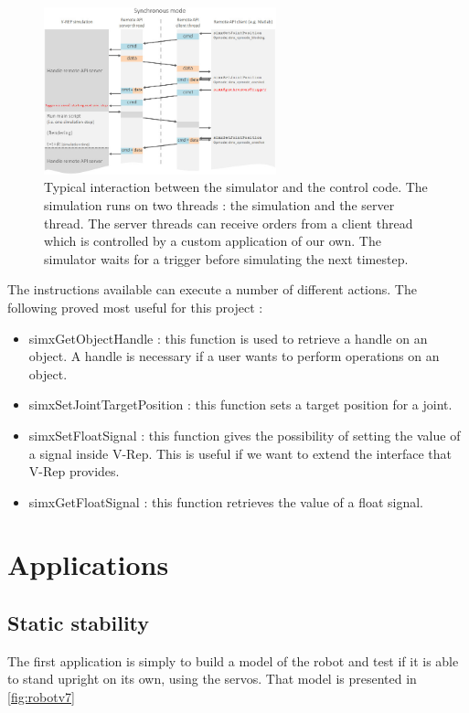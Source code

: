 \begin{figure}[htp]
\center
\includegraphics[width=0.6\textwidth]{figures/remoteApiSynchronous}
\caption[Simulation interaction]{Typical interaction between the simulator and the control code. The simulation runs on two threads : the simulation and the server thread. The server threads can receive orders from a client thread which is controlled by a custom application of our own. The simulator waits for a trigger before simulating the next timestep.}
\label{fig:remoteApi}
\end{figure}

The instructions available can execute a number of different actions. The following proved most useful for this project :\begin{itemize}
\item simxGetObjectHandle : this function is used to retrieve a handle on an object. A handle is necessary if a user wants to perform operations on an object.
\item simxSetJointTargetPosition : this function sets a target position for a joint.
\item simxSetFloatSignal : this function gives the possibility of setting the value of a signal inside V-Rep. This is useful if we want to extend the interface that V-Rep provides.
\item simxGetFloatSignal : this function retrieves the value of a float signal. 
\end{itemize}

%

\section{Applications}
\subsection{Static stability}
The first application is simply to build a model of the robot and test if it is able to stand upright on its own, using the servos. That model is presented in \cref{fig:robotv7}

